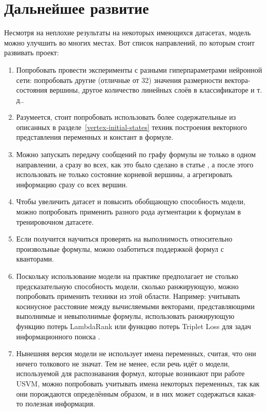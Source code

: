 \newpage

\section{Дальнейшее развитие}

Несмотря на неплохие результаты на некоторых имеющихся датасетах, модель можно улучшить во многих местах. Вот список направлений, по которым стоит развивать проект:

\begin{enumerate}
    \item Попробовать провести эксперименты с разными гиперпараметрами нейронной сети: попробовать другие (отличные от 32) значения размерности вектора-состояния вершины, другое количество линейных слоёв в классификаторе и т. д..
    \item Разумеется, стоит попробовать использовать более содержательные из описанных в разделе~\ref{vertex-initial-states} техник построения векторного представления переменных и констант в формуле.
    \item Можно запускать передачу сообщений по графу формулы не только в одном направлении, а сразу во всех, как это было сделано в статье \cite{gnn-for-scheduling-paper}, а после этого использовать не только состояние корневой вершины, а агрегировать информацию сразу со всех вершин.
    \item Чтобы увеличить датасет и повысить обобщающую способность модели, можно попробовать применить разного рода аугментации к формулам в тренировочном датасете.
    \item Если получится научиться проверять на выполнимость относительно произвольные формулы, можно озаботиться поддержкой формул с кванторами.
    \item Поскольку использование модели на практике предполагает не столько предсказательную способность модели, сколько ранжирующую, можно попробовать применить техники из этой области. Например: учитывать косинусное расстояние между вычисляемыми векторами, представляющими выполнимые и невыполнимые формулы, использовать ранжирующую функцию потерь LambdaRank \cite{lambda-rank-paper} или функцию потерь Triplet Loss для задач информационного поиска \cite{triplet-loss-paper-1} \cite{triplet-loss-paper-2}.
    \item Нынешняя версия модели не использует имена переменных, считая, что они ничего толкового не значат. Тем не менее, если речь идёт о модели, используемой для распознавания формул, которые возникают при работе USVM, можно попробовать учитывать имена некоторых переменных, так как они порождаются определённым образом, и в них может содержаться какая-то полезная информация.

\end{enumerate}
